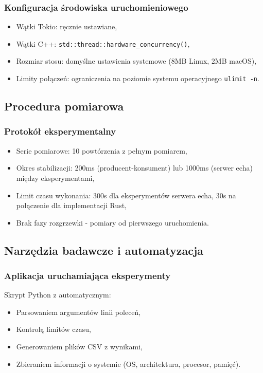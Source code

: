 \subsubsection{Konfiguracja środowiska uruchomieniowego}
\begin{itemize}
    \item Wątki Tokio: ręcznie ustawiane,
    \item Wątki C++: \texttt{std::thread::hardware\_concurrency()},
    \item Rozmiar stosu: domyślne ustawienia systemowe (8MB Linux, 2MB macOS),
    \item Limity połączeń: ograniczenia na poziomie systemu operacyjnego \texttt{ulimit -n}.
\end{itemize}

\subsection{Procedura pomiarowa}

\subsubsection{Protokół eksperymentalny}
\begin{itemize}
    \item Serie pomiarowe: 10 powtórzenia z pełnym pomiarem,
    \item Okres stabilizacji: 200ms (producent-konsument) lub 1000ms (serwer echa) między eksperymentami,
    \item Limit czasu wykonania: 300s dla eksperymentów serwera echa, 30s na połączenie dla implementacji Rust,
    \item Brak fazy rozgrzewki  - pomiary od pierwszego uruchomienia.
\end{itemize}

\subsection{Narzędzia badawcze i automatyzacja}

\subsubsection{Aplikacja uruchamiająca eksperymenty}
Skrypt Python z automatycznym:
\begin{itemize}
    \item Parsowaniem argumentów linii poleceń,
    \item Kontrolą limitów czasu,
    \item Generowaniem plików CSV z wynikami,
    \item Zbieraniem informacji o systemie (OS, architektura, procesor, pamięć).
\end{itemize}

